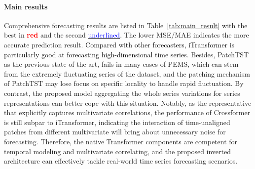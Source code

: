 \documentclass{article} %
\newcommand{\update}[1]{{\textcolor{black}{#1}}}
\newcommand{\boldres}[1]{{\textbf{\textcolor{red}{#1}}}}
\newcommand{\secondres}[1]{{\underline{\textcolor{blue}{#1}}}}
\begin{document}
\paragraph{Main results} Comprehensive forecasting results are listed in Table~\ref{tab:main_result} with the best in \boldres{red} and the second \secondres{underlined}. The lower MSE/MAE indicates the more accurate prediction result. \update{Compared with other forecasters, iTransformer is particularly good at forecasting high-dimensional time series}. Besides, PatchTST as the previous state-of-the-art, fails in many cases of PEMS, which can stem from the extremely fluctuating series of the dataset, and the patching mechanism of PatchTST may lose focus on specific locality to handle rapid fluctuation. By contrast, the proposed model aggregating the whole series variations for series representations can better cope with this situation. Notably, as the representative that explicitly captures multivariate correlations, the performance of Crossformer is still subpar to iTransformer, indicating the interaction of time-unaligned patches from different multivariate will bring about unnecessary noise for forecasting. Therefore, the native Transformer components are competent for temporal modeling and multivariate correlating, and the proposed inverted architecture can effectively tackle real-world time series forecasting scenarios.
\end{document}
